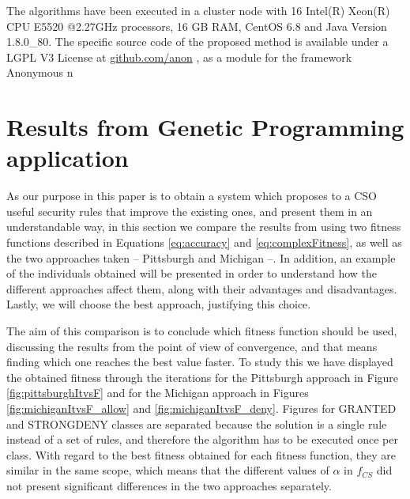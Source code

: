 \documentclass[runningheads]{llncs}
\begin{document}
The algorithms have been executed in a cluster node with 16 Intel(R) Xeon(R) CPU E5520
@2.27GHz processors, 16 GB RAM, CentOS 6.8 and Java Version
1.8.0\_80. The specific source code of the proposed method is available under a LGPL V3 License 
at \url{github.com/anon}
, as a module for 
the framework Anonymous
n

\section{Results from Genetic Programming application} 
\label{sec:gp}

As our purpose in this paper is to obtain a system which proposes to a CSO useful security rules that improve the existing ones, and present them in an understandable way, in this section we compare the results from using two fitness functions
described in Equations \ref{eq:accuracy} and \ref{eq:complexFitness}, as well as the two approaches taken -- Pittsburgh and Michigan --. In addition, an example of the individuals obtained will be presented in order to understand how the different approaches affect them, along with
their advantages and disadvantages.
Lastly, we will choose the best
approach, justifying this choice. 


\label{subsec:fitnesscomparison}

The aim of this comparison is to conclude which fitness function
should be used, discussing the results from the point of view of
convergence, and that means finding which one reaches the best value
faster. %
To study this we have displayed the obtained fitness through the iterations for the Pittsburgh approach in Figure \ref{fig:pittsburghItvsF} and for the Michigan approach in Figures \ref{fig:michiganItvsF_allow} and \ref{fig:michiganItvsF_deny}. Figures for GRANTED and STRONGDENY classes are separated because the solution is a single rule instead of a set of rules, and therefore the algorithm has to be executed once per class. With regard to the best fitness obtained for each fitness function, they are similar in the same scope, which means that the different values of $\alpha$ in $f_{CS}$ did not present significant differences in the two approaches separately.
\end{document}
